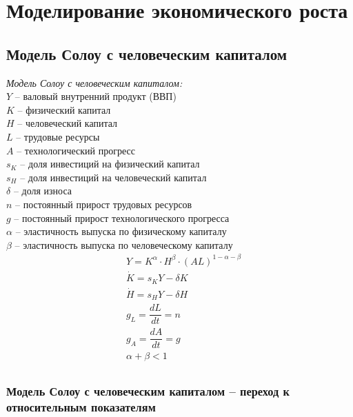 \section*{Моделирование экономического роста}

\subsection*{Модель Солоу с человеческим капиталом}

\textit{Модель Солоу с человеческим капиталом:}\\
$Y$ -- валовый внутренний продукт (ВВП)\\
$K$ -- физический капитал\\
$H$ -- человеческий капитал\\
$L$ -- трудовые ресурсы\\
$A$ -- технологический прогресс\\
$s_K$ -- доля инвестиций на физический капитал\\
$s_H$ -- доля инвестиций на человеческий капитал\\
$\delta$ -- доля износа\\
$n$ -- постоянный прирост трудовых ресурсов\\
$g$ -- постоянный прирост технологического прогресса\\
$\alpha$ -- эластичность выпуска по физическому капиталу\\
$\beta$ -- эластичность выпуска по человеческому капиталу\\

\begin{align*}
& Y = K^{\alpha} \cdot H^{\beta} \cdot (AL)^{1-\alpha-\beta}\\
& \dot{K} = s_K Y - \delta K\\
& \dot{H} = s_H Y - \delta H\\
& g_L = \dfrac{dL}{dt} = n\\
& g_A = \dfrac{dA}{dt} = g\\
& \alpha + \beta < 1\\
\end{align*}

\subsubsection*{Модель Солоу с человеческим капиталом -- переход к относительным показателям}

